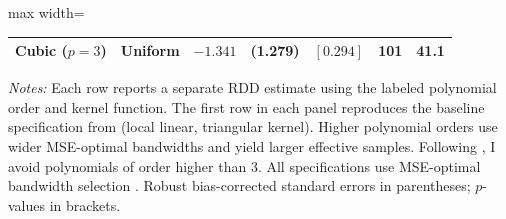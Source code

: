 \begin{table}[htbp]
\begin{adjustbox}{max width=\textwidth}
\begin{tabular}{llccccc}
Cubic ($p=3$) & Uniform & $-1.341$ & (1.279) & $[0.294]$ & 101 & 41.1 \\
\hline\hline
\end{tabular}
\end{adjustbox}
\begin{minipage}{0.95\textwidth}
\footnotesize
\textit{Notes:} Each row reports a separate RDD estimate using the labeled polynomial order and kernel function. The first row in each panel reproduces the baseline specification from  (local linear, triangular kernel). Higher polynomial orders use wider MSE-optimal bandwidths and yield larger effective samples. Following \citet{gelman2019}, I avoid polynomials of order higher than 3. All specifications use MSE-optimal bandwidth selection \citep{calonico2014}. Robust bias-corrected standard errors in parentheses; $p$-values in brackets.
\end{minipage}
\end{table}
